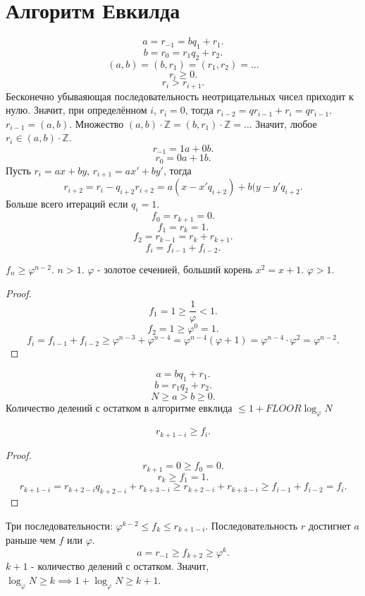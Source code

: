 \documentclass[11pt, oneside]{article}   	%
\begin{document}
\section{Алгоритм Евкилда}
\[ a=r_{-1}=bq_1+r_1 .\] 
\[ b=r_{0}=r_1q_2+r_2 .\] 
\[ \left(a, b\right) = \left( b, r_1 \right) = \left( r_1, r_2 \right) = \ldots\]
\[ r_i \ge 0 .\]
\[ r_i > r_{i+1} .\]
Бесконечно убываяющая последовательность неотрицательных чисел приходит к нулю. Значит, при определённом $i$,  $r_i=0$, тогда $r_{i-2} = qr_{i-1}+r_i=qr_{i-1}$. $r_{i-1} = \left( a, b \right) $.
Множество  $\left( a,b \right)\cdot \mathbb{Z} = \left( b, r_1 \right) \cdot \mathbb{Z} = \ldots $ 
Значит, любое $r_i \in \left( a, b \right) \cdot \mathbb{Z}$.
    \[ r_{-1} = 1a+0b .\]
    \[ r_0 = 0a+1b .\]
Пусть $r_i = ax+by$,  $r_{i+1} = ax'+by'$, тогда 
\[ r_{i+2} = r_i -q_{i+2}r_{i+2} = a(x-x'q_{i+2})+b(y-y'q_{i+2} .\]
Больше всего итераций если $q_i=1$.
 \[f_0 = r_{k+1}=0 .\]
 \[f_1 = r_k=1 .\]
 \[f_2 = r_{k-1}=r_k+r_{k+1} .\]
\[ f_i = f_{i-1} + f_{i-2} .\]
\begin{theorem}
    $f_n \ge \varphi^{n-2}$. $n>1$. $\varphi$ - золотое сеченией, больший корень  $x^2=x+1$. $\varphi>1$.\\
    \begin{proof}
        
    \[ f_1 = 1 \ge  \frac{1}{\varphi} < 1 .\]
    \[ f_2 = 1 \ge \varphi^0 = 1 .\] 
    \[ f_i = f_{i-1}+f_{i-2} \ge \varphi^{n-3}+\varphi^{n-4}=\varphi^{n-4}\left( \varphi+1 \right) = \varphi^{n-4}\cdot \varphi^2=\varphi^{n-2} .\] 
    \end{proof}
\end{theorem}
\[ a=bq_1+r_1 .\] 
\[ b=r_1q_2+r_2 .\]
\[ N \ge a > b \ge 0 .\] 
Количество делений с остатком в алгоритме евклида $\le 1+FLOOR \log_{\varphi}N$
\begin{theorem}
    \[ r_{k+1-i} \ge f_{i} .\]
   \begin{proof}
        \[ r_{k+1}=0 \ge f_0 = 0 .\]
        \[ r_k \ge f_1=1 .\]
        \[ r_{k+1-i} = r_{k+2-i}q_{k+2-i}+r_{k+3-i} \ge r_{k+2-i}+r_{k+3-i} \ge  f_{i-1}+f_{i-2}=f_{i} .\] 
   \end{proof} 
\end{theorem}
Три последовательности: $\varphi^{k-2} \le f_{k} \le r_{k+1-i}$. Последовательность  $r$ достигнет  $a $ раньше чем  $f$ или  $\varphi$.
 \[ a=r_{-1}\ge f_{k+2}\ge \varphi^{k} .\] 
 $k+1$ - количество делений с остатком. Значит, $\log_{\varphi}N \ge k \implies 1+\log_{\varphi}N \ge k+1$.
\end{document}
